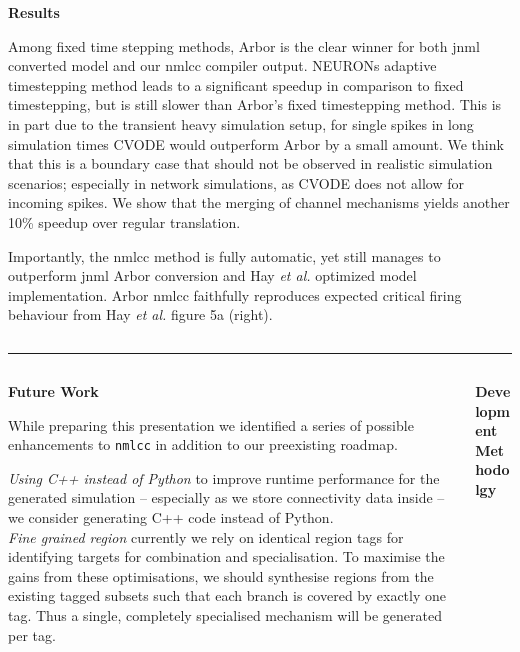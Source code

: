 \documentclass{beamer}
\begin{document}
\begin{frame}[t, fragile]
\begin{columns}
\begin{column}{0.74\textwidth}
\begin{columns}[t]
\begin{column}[t]{0.54\textwidth}
      \textbf{Results}

      Among fixed time stepping methods, Arbor is the clear winner for both jnml
      converted model and our nmlcc compiler output. NEURONs adaptive
      timestepping method leads to a significant speedup in comparison to fixed
      timestepping, but is still slower than Arbor's fixed
      timestepping method. This is in part due to the transient heavy simulation
      setup, for single spikes in long simulation times CVODE would outperform
      Arbor by a small amount. We think that this is a boundary case that should
      not be observed in realistic simulation scenarios; especially in network
      simulations, as CVODE does not allow for incoming spikes. We show that the
      merging of channel mechanisms yields another 10\% speedup over regular
      translation.

      Importantly, the nmlcc method is fully automatic, yet still manages to
      outperform jnml Arbor conversion and Hay \emph{et al.} optimized model
      implementation. Arbor nmlcc faithfully reproduces expected critical firing
      behaviour from Hay \emph{et al.} figure 5a (right).
    \end{column}
  \end{columns}
  \vspace*{1ex}
  \textcolor{arbred}{\rule{\textwidth}{0.59ex}}
  \vspace*{-1ex}
  \begin{columns}[t]
    \begin{column}[t]{0.49\textwidth}
      \textbf{Future Work}

      While preparing this presentation we identified a series of possible
      enhancements to \texttt{nmlcc} in addition to our preexisting roadmap.

      \emph{Using C++ instead of Python} to improve runtime performance for the
      generated simulation -- especially as we store connectivity data inside --
      we consider generating C++ code instead of Python.\\[1.5ex]
      \emph{Fine grained region} currently we rely on identical region tags for
      identifying targets for combination and specialisation. To maximise the
      gains from these optimisations, we should synthesise regions from the
      existing tagged subsets such that each branch is covered by exactly one
      tag. Thus a single, completely specialised mechanism will be generated per
      tag.
    \end{column}
    \begin{column}[t]{0.49\textwidth}
      \textbf{Development Methodolgy}


\end{column}
\end{columns}
\end{column}
\end{columns}
\end{frame}
\end{document}

